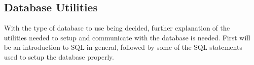 \subsection{Database Utilities}

With the type of database to use being decided, further explanation of the utilities needed to setup and communicate with the database is needed. First will be an introduction to SQL in general, followed by some of the SQL statements used to setup the database properly.